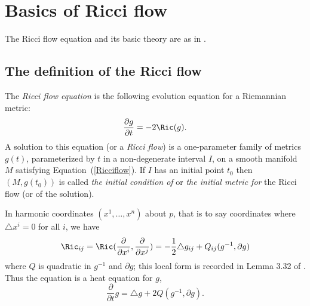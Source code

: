 \chapter{Basics of Ricci flow}
\label{chap:flowbasics}
\label{flowbasics}
The Ricci flow equation and its basic theory are as in
\cite{Hamilton3MPRC,ChowKnopf}.
\section{The definition of the Ricci flow}
\quad
\begin{definition}\label{def:ricci-flow}
\leanok

The {\em Ricci flow equation} is the
following evolution equation for a Riemannian metric:
\begin{equation}\label{Ricciflow}
\frac{\partial g}{\partial t}= -2\Ric(g). \end{equation} A solution to
this equation (or a {\em Ricci flow}) is a one-parameter
family of metrics $g(t)$, parameterized by $t$ in a non-degenerate interval
$I$, on a smooth manifold $M$ satisfying Equation~(\ref{Ricciflow}). If $I$ has
an initial point $t_0$ then $(M,g(t_0))$ is called  {\sl the initial condition
of} or {\em the initial metric for}  the
Ricci flow (or of the solution).
\end{definition}



In harmonic coordinates $(x^1,\ldots,x^n)$ about $p$,
 that is to say coordinates where $\triangle x^i=0$ for all $i$,
we have
\[ \Ric_{ij}=\Ric(\frac{\partial}{\partial x^i},\frac{\partial}{\partial x^j})=
-\frac{1}{2}\triangle g_{ij} + Q_{ij}(g^{-1},\partial g)\]
where $Q$ is quadratic in $g^{-1}$ and $\partial g$; this local form is
recorded in Lemma 3.32 of \cite{ChowKnopf}. Thus the equation is a heat equation for $g$,
\[ \frac{\partial}{\partial t}g =
\triangle g +2Q(g^{-1},\partial g). \]

